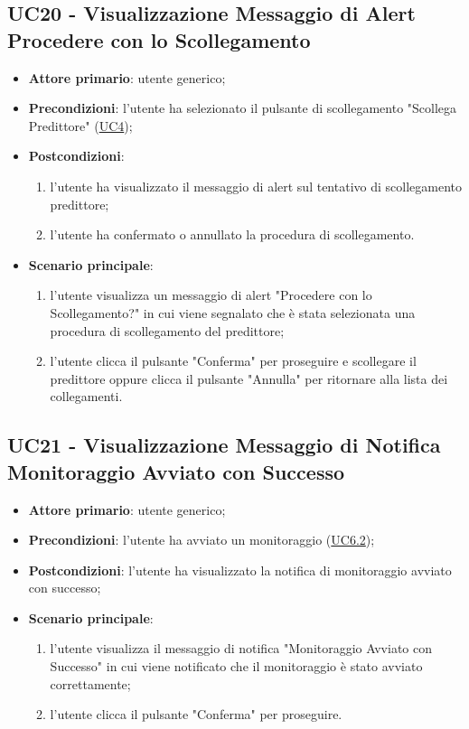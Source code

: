 	\subsection{UC20 - Visualizzazione Messaggio di Alert Procedere con lo Scollegamento}
		\begin{itemize}
			\item\textbf{Attore primario}: utente generico;
			\item\textbf{Precondizioni}: l’utente ha selezionato il pulsante di scollegamento "Scollega Predittore" (\hyperref[par:UC4]{UC4});
			\item\textbf{Postcondizioni}:
				\begin{enumerate}
					\item l'utente ha visualizzato il messaggio di alert sul tentativo di scollegamento predittore;
					\item l'utente ha confermato o annullato la procedura di scollegamento.
				\end{enumerate}
			\item\textbf{Scenario principale}:
				\begin{enumerate}
					\item l’utente visualizza un messaggio di alert "Procedere con lo Scollegamento?" in cui viene segnalato che è stata selezionata una procedura di scollegamento del predittore;
					\item l'utente clicca il pulsante "Conferma" per proseguire e scollegare il predittore oppure clicca il pulsante "Annulla" per ritornare alla lista dei collegamenti.
				\end{enumerate}
		\end{itemize}	


	\label{par:UC21}
	\subsection{UC21 - Visualizzazione Messaggio di Notifica Monitoraggio Avviato con Successo}	
		\begin{itemize}
			\item\textbf{Attore primario}: utente generico;
			\item\textbf{Precondizioni}: l’utente ha avviato un monitoraggio (\hyperref[par:UC6.2]{UC6.2});
			\item\textbf{Postcondizioni}: l’utente ha visualizzato la notifica di monitoraggio avviato con successo;
			\item\textbf{Scenario principale}:
				\begin{enumerate}
					\item l’utente visualizza il messaggio di notifica "Monitoraggio Avviato con Successo" in cui viene notificato che il monitoraggio è stato avviato correttamente;
					\item l'utente clicca il pulsante "Conferma" per proseguire.		
				\end{enumerate}		
		\end{itemize}


